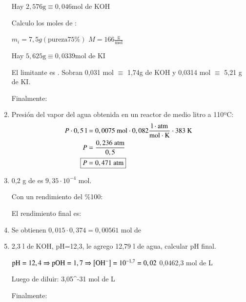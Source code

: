 \begin{enumerate}
\hfil
Hay $2,576\text{g} \equiv 0,046 \text{mol}$ de KOH
\hfil

Calculo los moles de :

\hfil $m_i = 7,5g (\text{pureza}75\%)$
\hfil $M = 166\frac{\text{g}}{\text{mol}}$
\hfil

\hfil
Hay $5,625\text{g} \equiv 0,0339 \text{mol}$ de KI
\hfil

El limitante es . Sobran 0,031 mol $\equiv$ 1,74g de KOH y 0,0314 mol $\equiv$ 5,21 g de KI.

Finalmente: 

\hfil
{}
\hfil


\item Presión del vapor del agua obtenida en un reactor de medio litro a 110ºC:
\begin{align*}
    P \cdot 0,5 \text{ l} &= 0,0075 \text{ mol} \cdot 0,082 \frac{\text{l}\cdot \text{atm}}{\text{mol} \cdot \text{K}} \cdot 383 \text{ K}\\
    P &= \dfrac{0,236 \text{ atm}}{0,5}\\
    \Aboxed{P &= 0,471\text{ atm}}
\end{align*}


\newpage
\item 0,2 g de  es $9,35\cdot 10^{-4}$ mol.

Con un rendimiento del \%100:

El rendimiento final es:

\hfil{}\hfil


\item Se obtienen $0,015\cdot 0,374 = 0,00561$ mol de 
\hfil{}
\hfil


\item 2,3 l de KOH, pH=12,3, le agrego 12,79 l de agua, calcular pH final.

\hfil $\text{pH}=12,4 \Rightarrow \text{pOH} = 1,7 \Rightarrow \left[\ce{OH^-}\right] = 10^{-1,7} = 0,02 $
\hfil
{}
{0,046}{2,3}
{mol de }{L}

Luego de diluir:
{3,05^{-3}}{1}
{mol de }{L}

Finalmente:

\hfil {}\hfil



\end{enumerate}
